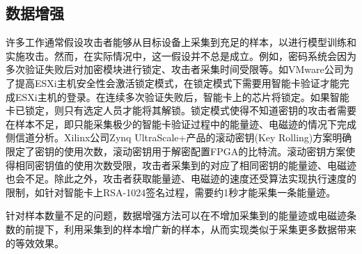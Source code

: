 {	\subsection{数据增强}
	
	许多工作通常假设攻击者能够从目标设备上采集到充足的样本，以进行模型训练和实施攻击。然而，在实际情况中，这一假设并不总是成立。例如，密码系统会因为多次验证失败后对加密模块进行锁定、攻击者采集时间受限等。如VMware公司为了提高ESXi主机安全性会激活锁定模式，在锁定模式下需要用智能卡验证才能完成ESXi主机的登录。在连续多次验证失败后，智能卡上的芯片将锁定。如果智能卡已锁定，则只有选定人员才能将其解锁\citep{GUID-04636353-4A11-4874-9D59-7F4F4E5CF1F}。锁定模式使得不知道密钥的攻击者需要在样本不足，即只能采集极少的智能卡验证过程中的能量迹、电磁迹的情况下完成侧信道分析。Xilinx公司Zynq UltraScale+产品的滚动密钥(Key Rolling)方案明确限定了密钥的使用次数\citep{UG1085}，滚动密钥用于解密配置FPGA的比特流。滚动密钥方案使得相同密钥值的使用次数受限，攻击者采集到的对应了相同密钥的能量迹、电磁迹也会不足。除此之外，攻击者获取能量迹、电磁迹的速度还受算法实现执行速度的限制，如针对智能卡上RSA-1024签名过程，需要约1秒才能采集一条能量迹。
	
	针对样本数量不足的问题，数据增强方法可以在不增加采集到的能量迹或电磁迹条数的前提下，利用采集到的样本增广新的样本，从而实现类似于采集更多数据带来的等效效果。
	
}
